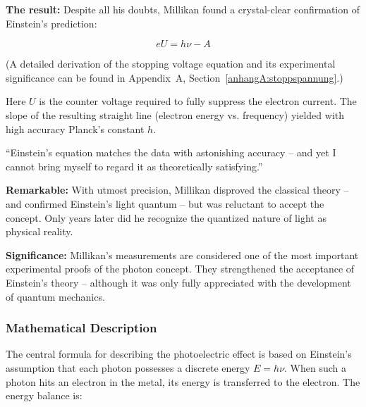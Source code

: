 \textbf{The result:} Despite all his doubts, Millikan found a crystal-clear confirmation of Einstein’s prediction:

\[
e U = h \nu - A
\]

(A detailed derivation of the stopping voltage equation and its experimental significance can be found in Appendix~A, Section~\ref{anhangA:stoppspannung}.)

Here \( U \) is the counter voltage required to fully suppress the electron current. The slope of the resulting straight line (electron energy vs. frequency) yielded with high accuracy Planck’s constant \( h \).

\vspace{1em}
\begin{tcolorbox}[physikbox, title=Robert A. Millikan (1916)\textit{ \cite{millikan1916}}]
	\label{box:einsteins gleichung passt}
	\small
	“Einstein’s equation matches the data with astonishing accuracy – and yet I cannot bring myself to regard it as theoretically satisfying.”
\end{tcolorbox}
\vspace{1em}

\textbf{Remarkable:} With utmost precision, Millikan disproved the classical theory – and confirmed Einstein’s light quantum – but was reluctant to accept the concept. Only years later did he recognize the quantized nature of light as physical reality.

\textbf{Significance:} Millikan’s measurements are considered one of the most important experimental proofs of the photon concept. They strengthened the acceptance of Einstein’s theory – although it was only fully appreciated with the development of quantum mechanics.

\subsubsection{Mathematical Description}

The central formula for describing the photoelectric effect is based on Einstein’s assumption that each photon possesses a discrete energy \( E = h\nu \). When such a photon hits an electron in the metal, its energy is transferred to the electron. The energy balance is:

